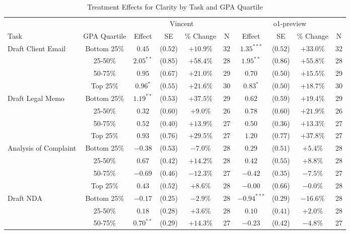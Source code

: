 \begin{table}[!htbp]
\centering
\caption{Treatment Effects for Clarity by Task and GPA Quartile}
\label{tab:clarity_gpa}
\begin{tabular}{lccccccccc}
\hline\hline
& & \multicolumn{4}{c}{Vincent} & \multicolumn{4}{c}{o1-preview} \\
\cline{3-10}
Task & GPA Quartile & Effect & SE & \% Change & N & Effect & SE & \% Change & N \\
\hline
\multirow{4}{*}{Draft Client Email} & Bottom 25\% & $0.45$ & ($0.52$) & $+10.9\%$ & 32 & $1.35^{***}$ & ($0.52$) & $+33.0\%$ & 32 \\
& 25-50\% & $2.05^{**}$ & ($0.85$) & $+58.4\%$ & 28 & $1.95^{**}$ & ($0.86$) & $+55.8\%$ & 28 \\
& 50-75\% & $0.95$ & ($0.67$) & $+21.0\%$ & 29 & $0.70$ & ($0.50$) & $+15.5\%$ & 29 \\
& Top 25\% & $0.96^{*}$ & ($0.55$) & $+21.6\%$ & 30 & $0.83^{*}$ & ($0.50$) & $+18.7\%$ & 30 \\
\hline
\multirow{4}{*}{Draft Legal Memo} & Bottom 25\% & $1.19^{**}$ & ($0.53$) & $+37.5\%$ & 29 & $0.62$ & ($0.59$) & $+19.4\%$ & 29 \\
& 25-50\% & $0.32$ & ($0.60$) & $+9.0\%$ & 26 & $0.78$ & ($0.60$) & $+21.9\%$ & 26 \\
& 50-75\% & $0.52$ & ($0.40$) & $+13.9\%$ & 27 & $0.50$ & ($0.36$) & $+13.3\%$ & 27 \\
& Top 25\% & $0.93$ & ($0.76$) & $+29.5\%$ & 27 & $1.20$ & ($0.77$) & $+37.8\%$ & 27 \\
\hline
\multirow{4}{*}{Analysis of Complaint} & Bottom 25\% & $-0.38$ & ($0.53$) & $-7.0\%$ & 28 & $0.29$ & ($0.51$) & $+5.4\%$ & 28 \\
& 25-50\% & $0.67$ & ($0.42$) & $+14.2\%$ & 28 & $0.42$ & ($0.55$) & $+8.8\%$ & 28 \\
& 50-75\% & $-0.69$ & ($0.46$) & $-12.3\%$ & 27 & $-0.42$ & ($0.35$) & $-7.5\%$ & 27 \\
& Top 25\% & $0.43$ & ($0.52$) & $+8.6\%$ & 28 & $-0.00$ & ($0.66$) & $-0.0\%$ & 28 \\
\hline
\multirow{4}{*}{Draft NDA} & Bottom 25\% & $-0.17$ & ($0.25$) & $-2.9\%$ & 28 & $-0.94^{***}$ & ($0.29$) & $-16.6\%$ & 28 \\
& 25-50\% & $0.18$ & ($0.28$) & $+3.6\%$ & 28 & $0.10$ & ($0.41$) & $+2.0\%$ & 28 \\
& 50-75\% & $0.70^{**}$ & ($0.29$) & $+14.3\%$ & 27 & $-0.23$ & ($0.42$) & $-4.8\%$ & 27 \\

\end{tabular}
\end{table}
